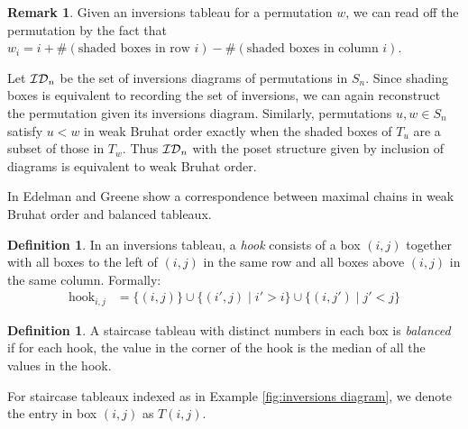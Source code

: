\documentclass{article}
\theoremstyle{definition}
\newtheorem{definition}[theorem]{Definition} %
\newtheorem{remark}[theorem]{Remark}
\begin{document}
\begin{remark}
    Given an inversions tableau for a permutation $w$, we can read off the permutation by the fact that $w_i = i + \#(\text{shaded boxes in row }i) - \#(\text{shaded boxes in column }i)$.
\end{remark}


Let $\mathcal{ID}_{n}$ be the set of inversions diagrams of permutations in $S_n$.
Since shading boxes is equivalent to recording the set of inversions, we can again reconstruct the permutation given its inversions diagram. Similarly, permutations $u,w \in S_n$ satisfy $u<w$ in weak Bruhat order exactly when the shaded boxes of $T_u$ are a subset of those in $T_w$. Thus $\mathcal{ID}_{n}$ with the poset structure given by inclusion of diagrams is equivalent to weak Bruhat order. 

In \cite{EG} Edelman and Greene show a correspondence between maximal chains in weak Bruhat order and balanced tableaux.

\begin{definition}
    In an inversions tableau, a \emph{hook} consists of a box $(i,j)$ together with all boxes to the left of $(i,j)$ in the same row and all boxes above $(i,j)$ in the same column. Formally:
    \begin{align*}
        \text{hook}_{i,j} &= \{ (i,j)\} \cup \{(i',j) \mid i' > i\} \cup \{(i,j') \mid j' < j\}
    \end{align*}
\end{definition}

\begin{definition}
   A staircase tableau with distinct numbers in each box is \emph{balanced} if for each hook, the value in the corner of the hook is the median of all the values in the hook. 
\end{definition}
For staircase tableaux indexed as in Example \ref{fig:inversions diagram}, we denote the entry in box $(i,j)$ as $T(i,j)$. 
\end{document}
